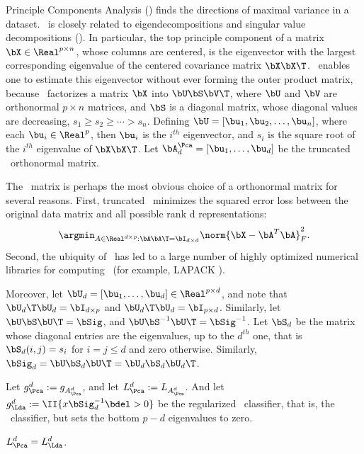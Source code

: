 \documentclass[10pt]{article}
\begin{document}
Principle Components Analysis (\Pca) finds the directions of maximal variance in a dataset.  \Pca~is closely related to eigendecompositions and singular value decompositions (\Svd).  In particular, the top principle component of a matrix $\bX \in \Real^{p \times n}$, whose columns are centered, is the eigenvector with the largest corresponding eigenvalue of the centered covariance matrix $\bX \bX\T$.  \Svd~enables one to estimate this eigenvector without ever forming the outer product matrix, because \Svd~factorizes a matrix $\bX$ into $\bU \bS \bV\T$, where  $\bU$ and $\bV$ are orthonormal  ${p \times n}$ matrices, and $\bS$ is a diagonal matrix, whose diagonal values are decreasing,  $s_1 \geq s_2 \geq \cdots > s_n$.  Defining $\bU =[\bu_1, \bu_2, \ldots, \bu_n]$, where each $\bu_i \in \Real^p$, then $\bu_i$ is the $i^{th}$ eigenvector, and $s_i$ is the square root of the $i^{th}$ eigenvalue of $\bX \bX\T$.  Let $\bA^{\Pca}_d =[\bu_1, \ldots , \bu_d]$ be the truncated \Pca~orthonormal matrix.

The \Pca~matrix is perhaps the most obvious choice of a orthonormal matrix for several reasons.  First, truncated \Pca~minimizes the squared error loss between the original data matrix and all possible rank d representations:
\begin{align*}
\argmin_{A \in \Real^{d \times p} : \bA \bA\T = \bI_{d \times d}} \norm{ \bX - \bA^T \bA }_F^2.
\end{align*}
Second, the ubiquity of \Pca~has led to a large number of highly optimized numerical libraries for computing \Pca~(for example, LAPACK \cite{Anderson1999a}). 

Moreover, let $\bU_d=[\bu_1,\ldots,\bu_d] \in \Real^{p \times d}$, and note that $\bU_d\T \bU_d = \bI_{d \times p}$ and $\bU_d\T \bU_d  = \bI_{p \times d}$.  Similarly, let $\bU \bS \bU\T = \bSig$, and $\bU \bS^{-1} \bU\T = \bSig^{-1}$.  Let $\bS_d$ be the matrix whose diagonal entries are the eigenvalues, up to the $d^{th}$ one, that is $\bS_d(i,j)=s_i$ for $i=j \leq d$ and zero otherwise.  Similarly, $\bSig_d=\bU \bS_d \bU\T=\bU_d \bS_d \bU_d\T$. 

Let $g_{\Pca}^d:=g_{A_{\Pca}^d}$, and let $L_{\Pca}^d:=L_{A_{\Pca}^d}$.   
And let $g_{\Lda}^d := \II \{ x \bSig_d^{-1} \bdel > 0\}$ be the regularized \Lda~classifier, that is, the \Lda~classifier, but sets the bottom $p-d$ eigenvalues to zero.

\begin{lem}
$L_{\Pca}^d = L_{\Lda}^d$.
\end{lem}
\end{document}
